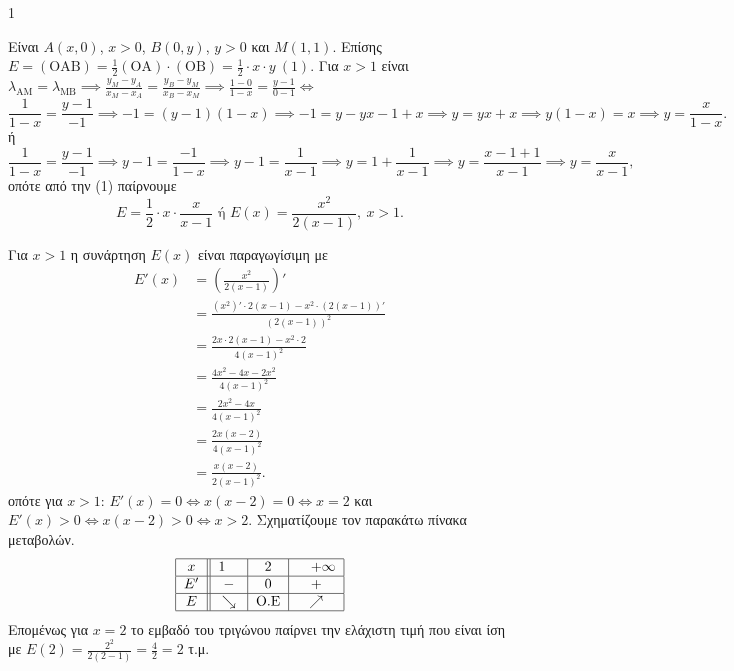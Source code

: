 \begin{ylh}{1}
    \item [Ύλη από εικόνα]
\end{ylh}

\begin{alist}
    \item[α)] Είναι $A(x,0)$, $x > 0$, $B(0, y)$, $y > 0$ και $M(1,1)$.
    Επίσης $E = (\text{OAB}) = \frac{1}{2} (\text{OA}) \cdot (\text{OB}) = \frac{1}{2} \cdot x \cdot y \ (1)$.
    Για $x > 1$ είναι $\lambda_{\text{AM}} = \lambda_{\text{MB}} \implies \frac{y_M - y_A}{x_M - x_A} = \frac{y_B - y_M}{x_B - x_M} \implies \frac{1 - 0}{1 - x} = \frac{y - 1}{0 - 1} \iff$
    \[
    \frac{1}{1 - x} = \frac{y - 1}{-1} \implies -1 = (y - 1)(1 - x) \implies -1 = y - yx - 1 + x \implies y = yx + x \implies y(1 - x) = x \implies y = \frac{x}{1 - x}.
    \]
    ή
    \[
    \frac{1}{1-x} = \frac{y-1}{-1} \implies y-1 = \frac{-1}{1-x} \implies y-1 = \frac{1}{x-1} \implies y = 1 + \frac{1}{x-1} \implies y = \frac{x-1+1}{x-1} \implies y = \frac{x}{x-1},
    \]
    οπότε από την (1) παίρνουμε
    \[
    E = \frac{1}{2} \cdot x \cdot \frac{x}{x-1} \text{ ή } E(x) = \frac{x^2}{2(x-1)}, \ x > 1.
    \]

    \item[β)] Για $x > 1$ η συνάρτηση $E(x)$ είναι παραγωγίσιμη με
    \begin{align*}
    E'(x) &= \left( \frac{x^2}{2(x-1)} \right)' \\
    &= \frac{(x^2)' \cdot 2(x-1) - x^2 \cdot (2(x-1))'}{(2(x-1))^2} \\
    &= \frac{2x \cdot 2(x-1) - x^2 \cdot 2}{4(x-1)^2} \\
    &= \frac{4x^2 - 4x - 2x^2}{4(x-1)^2} \\
    &= \frac{2x^2 - 4x}{4(x-1)^2} \\
    &= \frac{2x(x-2)}{4(x-1)^2} \\
    &= \frac{x(x-2)}{2(x-1)^2}.
    \end{align*}
    οπότε για $x > 1$: $E'(x) = 0 \iff x(x-2) = 0 \iff x = 2$ και
    $E'(x) > 0 \iff x(x-2) > 0 \iff x > 2$. Σχηματίζουμε τον παρακάτω πίνακα μεταβολών.
    \[
    \begin{tabular}{|c||c|c|c|}
        \hline
        $x$ & $1 \quad$ & $2$ & $\quad +\infty$ \\
        \hline
        $E'$ & $-$ & $0$ & $+$ \\
        \hline
        $E$ & $\searrow$ & O.E & $\nearrow$ \\
        \hline
    \end{tabular}
    \]
    Επομένως για $x = 2$ το εμβαδό του τριγώνου παίρνει την ελάχιστη τιμή που είναι ίση
    με $E(2) = \frac{2^2}{2(2-1)} = \frac{4}{2} = 2$ τ.μ.


\end{alist}
